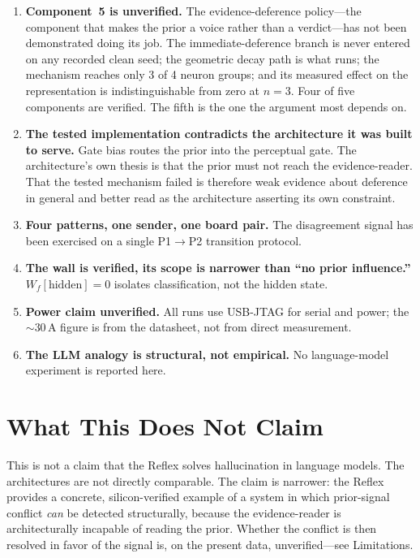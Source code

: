 \documentclass[11pt,letterpaper]{article}
\begin{document}
\begin{enumerate}
\item \textbf{Component~5 is unverified.} The evidence-deference policy---the component that makes the prior a voice rather than a verdict---has not been demonstrated doing its job. The immediate-deference branch is never entered on any recorded clean seed; the geometric decay path is what runs; the mechanism reaches only 3 of 4 neuron groups; and its measured effect on the representation is indistinguishable from zero at $n=3$. Four of five components are verified. The fifth is the one the argument most depends on.

\item \textbf{The tested implementation contradicts the architecture it was built to serve.} Gate bias routes the prior into the perceptual gate. The architecture's own thesis is that the prior must not reach the evidence-reader. That the tested mechanism failed is therefore weak evidence about deference in general and better read as the architecture asserting its own constraint.

\item \textbf{Four patterns, one sender, one board pair.} The disagreement signal has been exercised on a single P1$\to$P2 transition protocol.

\item \textbf{The wall is verified, its scope is narrower than ``no prior influence.''} $W_f[\text{hidden}] = 0$ isolates classification, not the hidden state.

\item \textbf{Power claim unverified.} All runs use USB-JTAG for serial and power; the $\sim$30\,\textmu A figure is from the datasheet, not from direct measurement.

\item \textbf{The LLM analogy is structural, not empirical.} No language-model experiment is reported here.
\end{enumerate}

\section{What This Does Not Claim}

This is not a claim that the Reflex solves hallucination in language models. The architectures are not directly comparable. The claim is narrower: the Reflex provides a concrete, silicon-verified example of a system in which prior-signal conflict \emph{can} be detected structurally, because the evidence-reader is architecturally incapable of reading the prior. Whether the conflict is then resolved in favor of the signal is, on the present data, unverified---see Limitations.
\end{document}
